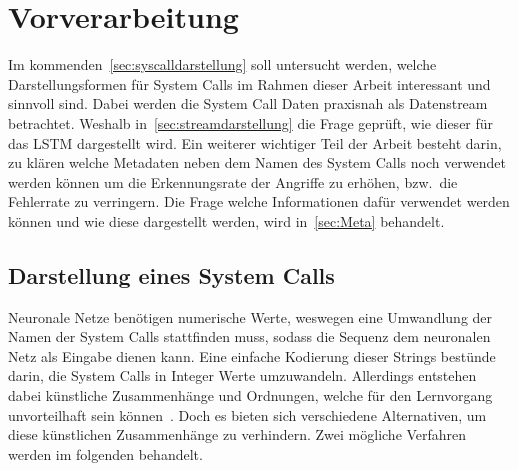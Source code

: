     \section{Vorverarbeitung}\label{sec:Preprocessing}
        Im kommenden~\autoref{sec:syscalldarstellung} soll untersucht werden, welche Darstellungsformen für System Calls im Rahmen dieser Arbeit interessant und sinnvoll sind.
        Dabei werden die System Call Daten praxisnah als Datenstream betrachtet.
        Weshalb in~\autoref{sec:streamdarstellung} die Frage geprüft, wie dieser für das \ac{LSTM} dargestellt wird.
        Ein weiterer wichtiger Teil der Arbeit besteht darin, zu klären welche Metadaten neben dem Namen des System Calls noch verwendet werden können um die Erkennungsrate der Angriffe zu erhöhen, bzw.\ die Fehlerrate zu verringern.
        Die Frage welche Informationen dafür verwendet werden können und wie diese dargestellt werden, wird in~\autoref{sec:Meta} behandelt.

        \subsection{Darstellung eines System Calls}\label{sec:syscalldarstellung}
            Neuronale Netze benötigen numerische Werte, weswegen eine Umwandlung der Namen der System Calls stattfinden muss, sodass die Sequenz dem neuronalen Netz als Eingabe dienen kann. 
            Eine einfache Kodierung dieser Strings bestünde darin, die System Calls in Integer Werte umzuwandeln.
            Allerdings entstehen dabei künstliche Zusammenhänge und Ordnungen, welche für den Lernvorgang unvorteilhaft sein können~\cite{NEURALBISHOP1995}.
            Doch es bieten sich verschiedene Alternativen, um diese künstlichen Zusammenhänge zu verhindern.
            Zwei mögliche Verfahren werden im folgenden behandelt.

